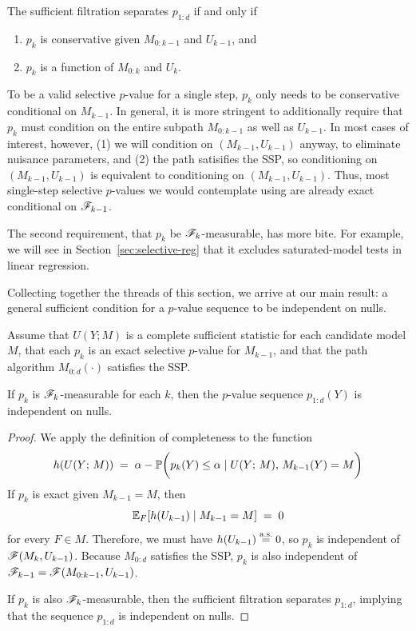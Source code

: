 \documentclass{article}
\begin{document}
The sufficient filtration separates $p_{1:d}$ if and only if 
\begin{enumerate}
\item $p_k$ is conservative given $M_{0:k-1}$ and $U_{k-1}$, and  
\item $p_k$ is a function of $M_{0:k}$ and $U_k$.
\end{enumerate}

To be a valid selective $p$-value for a single step, $p_k$ only needs to be conservative conditional on $M_{k-1}$. In general, it is more stringent to additionally require that $p_k$ must condition on the entire subpath $M_{0:k-1}$ as well as $U_{k-1}$. In most cases of interest, however, (1) we will condition on $(M_{k-1}, U_{k-1})$ anyway, to eliminate nuisance parameters, and (2) the path satisifies the SSP, so conditioning on $(M_{k-1}, U_{k-1})$ is equivalent to conditioning on $(M_{k-1}, U_{k-1})$. Thus, most single-step selective $p$-values we would contemplate using are already exact conditional on $\sF_{k-1}$.

The second requirement, that $p_k$ be $\sF_k$-measurable, has more bite. For example, we will see in Section~\ref{sec:selective-reg} that it excludes saturated-model tests in linear regression.

Collecting together the threads of this section, we arrive at our main result: a general sufficient condition for a $p$-value sequence to be independent on nulls.
\begin{theorem} \label{thm:suffCond}
Assume that $U(Y; M)$ is a complete sufficient statistic for each candidate model $M$, that each $p_k$ is an exact selective $p$-value for $M_{k-1}$, and that the path algorithm $M_{0:d}(\cdot)$ satisfies the SSP.

If $p_k$ is $\sF_k$-measurable for each $k$, then the $p$-value sequence $p_{1:d}(Y)$ is independent on nulls.
\end{theorem}

\begin{proof}
We apply the definition of completeness to the function 
\[
h(U(Y; \, M)) \;=\; 
\alpha - \P\bigg(p_k(Y) \leq \alpha \mid U(Y; \, M), \, M_{k-1}(Y) = M\bigg)
\]
If $p_k$ is exact given $M_{k-1} = M$, then 
\[
\E_F[h(U_{k-1}) \mid M_{k-1}=M] \;=\; 0
\] 
for every $F\in M$. Therefore, we must have $h(U_{k-1})\eqAS 0$, so $p_k$ is independent of $\sF(M_k, U_{k-1})$. Because $M_{0:d}$ satisfies the SSP, $p_k$ is also independent of $\sF_{k-1} = \sF(M_{0:k-1}, U_{k-1})$.

If $p_k$ is also $\sF_k$-measurable, then the sufficient filtration separates $p_{1:d}$, implying that the sequence $p_{1:d}$ is independent on nulls.
\end{proof}
\end{document}
